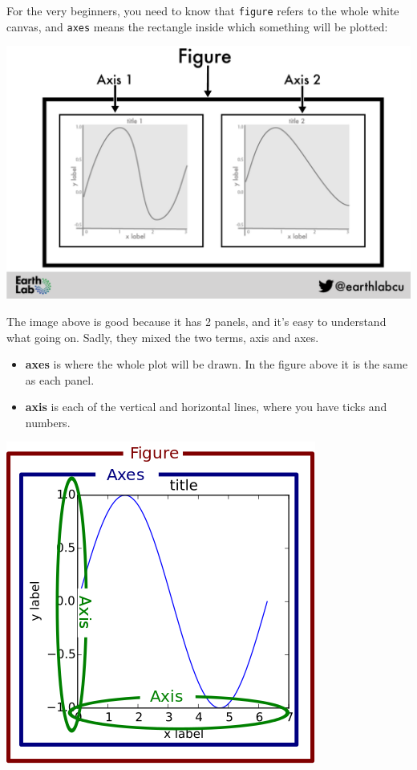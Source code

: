 \documentclass[
  letterpaper,
  DIV=11,
  numbers=noendperiod,
  oneside]{scrreprt}
\providecommand{\tightlist}{%
  \setlength{\itemsep}{0pt}\setlength{\parskip}{0pt}}\usepackage{longtable,booktabs,array}
\begin{document}
For the very beginners, you need to know that \texttt{figure} refers to
the whole white canvas, and \texttt{axes} means the rectangle inside
which something will be plotted:

\includegraphics{basics/fig-2-plots.png}

The image above is good because it has 2 panels, and it's easy to
understand what going on. Sadly, they mixed the two terms, axis and
axes.

\begin{itemize}
\tightlist
\item
  \textbf{axes} is where the whole plot will be drawn. In the figure
  above it is the same as each panel.
\item
  \textbf{axis} is each of the vertical and horizontal lines, where you
  have ticks and numbers.
\end{itemize}

\includegraphics{basics/axis-vs-axes.png}
\end{document}
